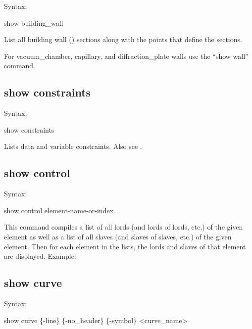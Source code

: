{{{{{{{{Syntax:
\begin{example}
  show building_wall
\end{example}

List all building wall () sections along with the points that define
the sections.

For vacuum_chamber, capillary, and diffraction_plate walls use the ``show wall'' command.


\subsection{show constraints}
\label{s:show.constraints}

Syntax:
\begin{example}
  show constraints
\end{example}

Lists data and variable constraints. Also see .


\subsection{show control}
\label{s:show.control}

Syntax:
\begin{example}
  show control {element-name-or-index}
\end{example}

This command compiles a list of all lords (and lords of lords, etc.) of the given element as well as
a list of all slaves (and slaves of slaves, etc.) of the given element. Then for each element in the
lists, the lords and slaves of that element are displayed. Example:


\subsection{show curve}
\label{s:show.curve}

Syntax:
\begin{example}
  show curve \{-line\} \{-no_header\} \{-symbol\} <curve_name>
\end{example}

}}}}}}}}
